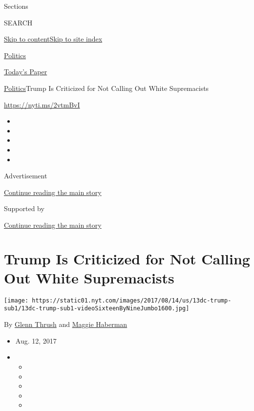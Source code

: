 Sections

SEARCH

\protect\hyperlink{site-content}{Skip to
content}\protect\hyperlink{site-index}{Skip to site index}

\href{https://www.nytimes.com/section/politics}{Politics}

\href{https://myaccount.nytimes.com/auth/login?response_type=cookie\&client_id=vi}{}

\href{https://www.nytimes.com/section/todayspaper}{Today's Paper}

\href{/section/politics}{Politics}\textbar{}Trump Is Criticized for Not
Calling Out White Supremacists

\url{https://nyti.ms/2vtmBvI}

\begin{itemize}
\item
\item
\item
\item
\item
\end{itemize}

Advertisement

\protect\hyperlink{after-top}{Continue reading the main story}

Supported by

\protect\hyperlink{after-sponsor}{Continue reading the main story}

\hypertarget{trump-is-criticized-for-not-calling-out-white-supremacists}{%
\section{Trump Is Criticized for Not Calling Out White
Supremacists}\label{trump-is-criticized-for-not-calling-out-white-supremacists}}

\texttt{[image: https://static01.nyt.com/images/2017/08/14/us/13dc-trump-sub1/13dc-trump-sub1-videoSixteenByNineJumbo1600.jpg]}

By \href{https://www.nytimes.com/by/glenn-thrush}{Glenn Thrush} and
\href{http://www.nytimes.com/by/maggie-haberman}{Maggie Haberman}

\begin{itemize}
\item
  Aug. 12, 2017
\item
  \begin{itemize}
  \item
  \item
  \item
  \item
  \item
  \end{itemize}
\end{itemize}

